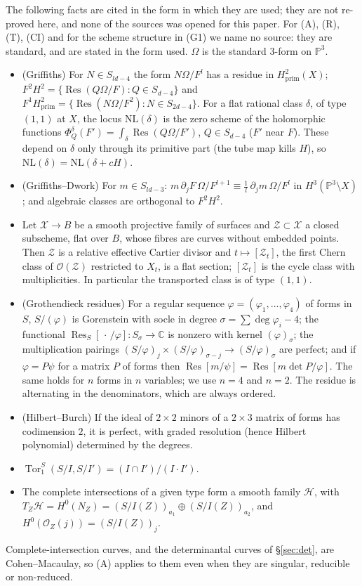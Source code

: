 \documentclass[11pt]{article}
\numberwithin{equation}{section}
\theoremstyle{remark}
\newcommand{\PP}{\mathbb{P}}
\newcommand{\CC}{\mathbb{C}}
\newcommand{\NL}{\mathrm{NL}}
\newcommand{\cH}{\mathcal{H}}
\newcommand{\Res}{\operatorname{Res}}
\begin{document}
The following facts are cited in the form in which they are used; they are not re-proved here, and none of the
sources \cite{Gr,CG,Ei} was opened for this paper. For (A), (R), (T), (CI) and for the scheme structure in (G1) we
name no source: they are standard, and are stated in the form used. $\Omega$ is the standard $3$-form on $\PP^3$.
\begin{itemize}
\item[(G1)] (Griffiths) For $N\in S_{ld-4}$ the form $N\Omega/F^l$ has a residue in $H^2_{\mathrm{prim}}(X)$;
$F^2H^2=\{\Res(Q\Omega/F):Q\in S_{d-4}\}$ and $F^1H^2_{\mathrm{prim}}=\{\Res(N\Omega/F^2):N\in S_{2d-4}\}$.
For a flat rational class $\delta$, of type $(1,1)$ at $X$, the locus $\NL(\delta)$ is the zero scheme of the
holomorphic functions $\Phi^\delta_Q(F')=\int_\delta\Res(Q\Omega/F')$, $Q\in S_{d-4}$ ($F'$ near $F$). These
depend on $\delta$ only through its primitive part (the tube map kills $H$), so $\NL(\delta)=\NL(\delta+cH)$.
\item[(G2)] (Griffiths--Dwork) For $m\in S_{ld-3}$: $m\,\partial_jF\,\Omega/F^{l+1}\equiv\frac1l\,\partial_jm\,
\Omega/F^l$ in $H^3(\PP^3\setminus X)$; and algebraic classes are orthogonal to $F^2H^2$.
\item[(A)] Let $\mathcal X\to B$ be a smooth projective family of surfaces and $\mathcal Z\subset\mathcal X$ a
closed subscheme, flat over $B$, whose fibres are curves without embedded points. Then $\mathcal Z$ is a relative
effective Cartier divisor and $t\mapsto[\mathcal Z_t]$, the first Chern class of $\mathcal O(\mathcal Z)$
restricted to $X_t$, is a flat section;
$[\mathcal Z_t]$ is the cycle class with multiplicities. In particular the transported class is of type $(1,1)$.
\item[(R)] (Grothendieck residues) For a regular sequence $\varphi=(\varphi_1,\dots,\varphi_4)$ of forms in $S$,
$S/(\varphi)$ is Gorenstein with socle in degree $\sigma=\sum\deg\varphi_i-4$; the functional
$\Res_S[\,\cdot\,/\varphi]\colon S_\sigma\to\CC$ is nonzero with kernel $(\varphi)_\sigma$; the multiplication
pairings $(S/\varphi)_j\times(S/\varphi)_{\sigma-j}\to(S/\varphi)_\sigma$ are perfect; and if $\varphi=P\psi$ for
a matrix $P$ of forms then $\Res[m/\psi]=\Res[m\det P/\varphi]$. The same holds for $n$ forms in $n$ variables; we use $n=4$ and $n=2$. The residue is alternating in the denominators, which are always ordered.
\item[(HB)] (Hilbert--Burch) If the ideal of $2\times2$ minors of a $2\times3$ matrix of forms has codimension
$2$, it is perfect, with graded resolution (hence Hilbert polynomial) determined by the degrees.
\item[(T)] $\operatorname{Tor}_1^S(S/I,S/I')=(I\cap I')/(I\cdot I')$.
\item[(CI)] The complete intersections of a given type form a smooth family $\cH$, with
$T_Z\cH=H^0(N_Z)=(S/I(Z))_{a_1}\oplus(S/I(Z))_{a_2}$, and $H^0(\mathcal O_Z(j))=(S/I(Z))_j$.
\end{itemize}
Complete-intersection curves, and the determinantal curves of \S\ref{sec:det}, are Cohen--Macaulay, so (A)
applies to them even when they are singular, reducible or non-reduced.
\end{document}
